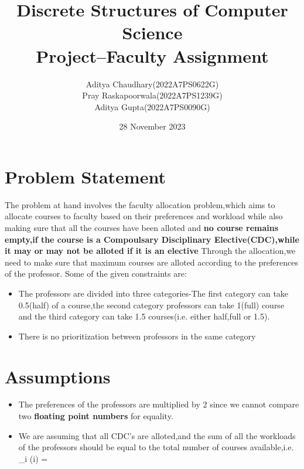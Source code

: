 \documentclass{article}
\title{Discrete Structures of Computer Science\\
Project--Faculty Assignment}
\author{Aditya Chaudhary(2022A7PS0622G)\\
         Pray Raskapoorwala(2022A7PS1239G)\\
         Aditya  Gupta(2022A7PS0090G)}
\date{28 November 2023}
\begin{document}
\maketitle
\section{Problem Statement}
The problem at hand involves the faculty allocation problem,which aims to allocate courses to faculty based on their preferences and workload while also making sure that all the courses have been alloted and \textbf{no course remains empty,if the course is a Compoulsary Disciplinary Elective(CDC),while it may or may not be alloted if it is an elective}
Through the allocation,we need to make sure that maximum courses are alloted according to the preferences of the professor.
Some of the given constraints are:\begin{itemize}
    \item The professors are divided into three categories-The first category can take 0.5(half) of a course,the second category professors can take 1(full) course and the third category can take 1.5 courses(i.e. either half,full or 1.5).
    \item There is no prioritization between professors in the same category
\end{itemize}

\section{Assumptions}
\begin{itemize}
 

\item The preferences of the professors are multiplied by 2 since we cannot compare two \textbf{floating point numbers} for equality.

\hspace{1cm}

 \item We are assuming that all CDC's are alloted,and the sum of all the workloads of the professors should be equal to the total number of courses available,i.e.\\

  \hspace{1cm}
  \sum_{i} (i) = 
  

\end{itemize}

\hspace{2cm}
\end{document}

